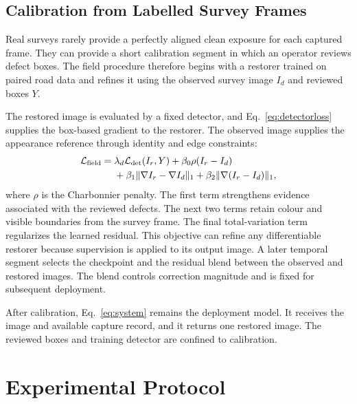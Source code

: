 \documentclass[journal]{IEEEtran}
\begin{document}
\subsection{Calibration from Labelled Survey Frames}
Real surveys rarely provide a perfectly aligned clean exposure for each captured frame. They can provide a short calibration segment in which an operator reviews defect boxes. The field procedure therefore begins with a restorer trained on paired road data and refines it using the observed survey image $I_d$ and reviewed boxes $Y$.

The restored image is evaluated by a fixed detector, and Eq.~\eqref{eq:detectorloss} supplies the box-based gradient to the restorer. The observed image supplies the appearance reference through identity and edge constraints:
\begin{equation}
\begin{split}
\mathcal{L}_{\rm field}={}&\lambda_d\mathcal{L}_{\rm det}(I_r,Y)
+\beta_0\rho(I_r-I_d)\\
&+\beta_1\|\nabla I_r-\nabla I_d\|_1
+\beta_2\|\nabla(I_r-I_d)\|_1,
\end{split}
\label{eq:fieldobjective}
\end{equation}
where $\rho$ is the Charbonnier penalty. The first term strengthens evidence associated with the reviewed defects. The next two terms retain colour and visible boundaries from the survey frame. The final total-variation term regularizes the learned residual. This objective can refine any differentiable restorer because supervision is applied to its output image. A later temporal segment selects the checkpoint and the residual blend between the observed and restored images. The blend controls correction magnitude and is fixed for subsequent deployment.

After calibration, Eq.~\eqref{eq:system} remains the deployment model. It receives the image and available capture record, and it returns one restored image. The reviewed boxes and training detector are confined to calibration.

\section{Experimental Protocol}
\end{document}
